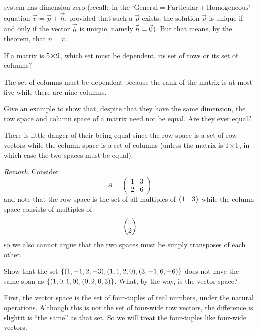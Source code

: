 \begin{exercises}
\begin{answer}
      system has dimension zero (recall:~in the 
      `$\text{General}=\text{Particular}+\text{Homogeneous}$' equation
       $\vec{v}=\vec{p}+\vec{h}$, provided that such a $\vec{p}$ exists,
       the solution $\vec{v}$ is unique if and only if the vector $\vec{h}$
       is unique, namely $\vec{h}=\vec{0}$).
       But that means, by the theorem, that $n=r$.
    \end{answer}
  \recommended \item
    If a matrix is \( 5 \! \times \! 9 \), which set must be dependent, its set of
    rows or its set of columns?
    \begin{answer}
      The set of columns must be dependent because the rank of the matrix
      is at most five while there are nine columns.  
    \end{answer}
  \item 
    Give an example to show that, despite that they have the same 
    dimension, the row space and column space of a matrix need not be equal.
    Are they ever equal?
    \begin{answer}
      There is little danger of their being equal since the row space
      is a set of row vectors while the column space is a set of
      columns (unless the matrix is \( 1 \! \times \! 1 \), in which case 
      the two spaces must be equal).

      \textit{Remark.}
      Consider
      \begin{equation*}
        A=\begin{pmatrix}
            1  &3  \\
            2  &6
          \end{pmatrix}
      \end{equation*}
      and note that the row space is the set of 
      all multiples of \( \begin{pmatrix} 1 &3 \end{pmatrix} \)
      while the column space consists of multiples of
      \begin{equation*}
        \begin{pmatrix} 1 \\ 2 \end{pmatrix}
      \end{equation*}
      so we also cannot argue that the two spaces must be simply 
      transposes of each other.  
    \end{answer}
  \item 
    Show that the set
    \( \mbox{$\{(1,-1,2,-3),(1,1,2,0),(3,-1,6,-6)\}$} \) does not have the
    same span as \( \mbox{$\{(1,0,1,0),(0,2,0,3)\}$} \).
    What, by the way, is the vector space?
    \begin{answer}
      First, the vector space is the set of four-tuples of real numbers, under
      the natural operations.
      Although this is not the set of four-wide row vectors, the difference
      is slight\Dash it is ``the same'' as that set.
      So we will treat the four-tuples like four-wide vectors.


\end{answer}
\end{exercises}
